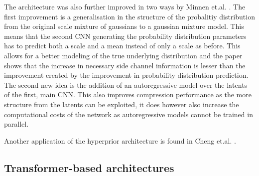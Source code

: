 The architecture was also further improved in two ways by Minnen et.al. \citep{minnen_joint_2018}. The first improvement is a generalisation in the structure of the probalitiy distribution from the original scale mixture of gaussians \citep{wainwright_scale_1999} to a gaussian mixture model. This means that the second CNN generating the probability distribution parameters has to predict both a scale and a mean instead of only a scale as before. This allows for a better modeling of the true underlying distribution and the paper shows that the increase in necessary side channel information is lesser than the improvement created by the improvement in probability distribution prediction.\\
The second new idea is the addition of an autoregressive model over the latents of the first, main CNN. This also improves compression performance as the more structure from the latents can be exploited, it does however also increase the computational costs of the network as autoregressive models cannot be trained in parallel. 

Another application of the hyperprior architecture is found in Cheng et.al. \citep{cheng_learned_2020}.

\subsection{Transformer-based architectures}
